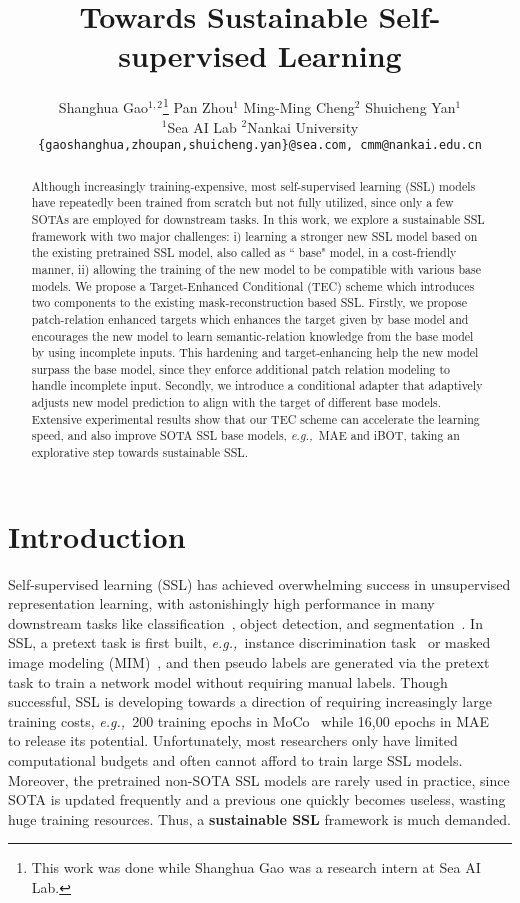 \documentclass{article} \usepackage{iclr2023_conference,times}
\title{Towards Sustainable Self-supervised Learning}
\author{Shanghua Gao$^{1,2}$\thanks{This work was done while Shanghua Gao was a research intern at Sea AI Lab.} \quad
Pan Zhou$^{1}$ \quad
Ming-Ming Cheng$^{2}$ \quad
Shuicheng Yan$^{1}$ \\
$^1$Sea AI Lab \quad $^2$Nankai University \\
\texttt{\{gaoshanghua,zhoupan,shuicheng.yan\}@sea.com, cmm@nankai.edu.cn} \\
}
\def\eg{\emph{e.g.,~}}
\begin{document}
\maketitle
\begin{abstract}

Although increasingly training-expensive, 
most self-supervised learning (SSL) models 
have repeatedly been trained from scratch
but not fully utilized, since 
only a few SOTAs are employed for downstream tasks. 
In this work, we explore a sustainable SSL framework 
with  two major challenges: 
i) learning a stronger new SSL model based on the existing 
pretrained SSL model, also called as `` base" model,  in a cost-friendly manner,
ii) allowing the training of the new model to be compatible with
various base models. 
We propose a Target-Enhanced Conditional (TEC) scheme 
which introduces two components to the existing mask-reconstruction based SSL.  
Firstly, we propose patch-relation enhanced targets which enhances the target given by base model and  encourages 
the new model to learn semantic-relation knowledge from the base model by using   
incomplete inputs. 
This hardening and target-enhancing help the new model surpass the base model, 
since they enforce additional patch relation modeling to handle incomplete input.  
Secondly, we introduce a conditional adapter that 
adaptively adjusts new model prediction to align with the target of different base models. 
Extensive experimental results show  that our TEC scheme can accelerate the 
learning speed, and also improve SOTA SSL base models, \eg MAE and iBOT,  
taking an explorative step towards sustainable SSL.
    
\end{abstract}

\section{Introduction}
\vspace{-10pt}
\label{sec:intro}
Self-supervised learning (SSL) has achieved overwhelming success 
in unsupervised representation learning, 
with astonishingly high performance in many downstream tasks 
like classification~\citep{zhou2021ibot,mugs2022SSL}, 
object detection, and segmentation~\citep{bao2021beit,he2022masked}.  
In SSL, a pretext task is first built, 
\eg instance discrimination task~\citep{He_2020_CVPR,chen2021mocov3} 
or masked image modeling (MIM)~\citep{bao2021beit,he2022masked},   
and then pseudo labels are generated via the pretext task to 
train a network model without requiring manual labels.  
Though successful, SSL is developing towards a direction of 
requiring increasingly large training costs,  
\eg 200 training epochs in MoCo~\citep{He_2020_CVPR}  
while 16,00 epochs in MAE~\citep{he2022masked} to release its potential. 
Unfortunately,  most researchers only have limited computational budgets 
and often cannot  afford to train large SSL models. 
Moreover, the pretrained non-SOTA SSL models are rarely used in practice, 
since  SOTA is updated frequently and a previous one quickly becomes useless, 
wasting huge training resources.  
Thus, a \textbf{sustainable SSL} framework is much demanded. 
\end{document}
